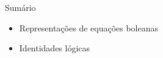 
\begin{frame}{Sumário}
    \begin{itemize}
        \item Representações de equações boleanas
        \item Identidades lógicas
    \end{itemize}
\end{frame}
